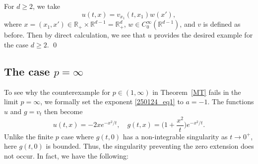\documentclass[reqno]{amsart}
\numberwithin{equation}{section}
\theoremstyle{plain}
\theoremstyle{definition}
\def\bR{\mathbb{R}}
\begin{document}
For $d\ge 2$, we take 
$$
u(t,x)=v_{x_1}(t, x_1)w(x'),
$$
where $x=(x_1, x')\in \bR_+\times \bR^{d-1}=\bR^d_+$, $w\in C^\infty_0(\bR^{d-1})$, and $v$ is 
defined as before.
Then by direct calculation, we see that $u$ provides the desired example for the case $d\ge 2$.
\qed

\subsection{The case $p=\infty$}\label{Sec:p_infty}
To see why the counterexample for $p \in (1, \infty)$ in Theorem~\ref{MT} fails in the limit $p=\infty$, we formally set the exponent \eqref{250124_eq1} to $a = -1$.
The functions $u$ and $g=v_t$ then become
$$
u(t,x) = -2x e^{-x^2/t}, \quad g(t,x) = \Big(1 + \frac{x^2}{t}\Big) e^{-x^2/t}.
$$
Unlike the finite $p$ case where $g(t,0)$ has a non-integrable singularity as $t \to 0^+$, here $g(t,0)$ is bounded.
Thus, the singularity preventing the zero extension does not occur.
In fact, we have the following:
\end{document}
